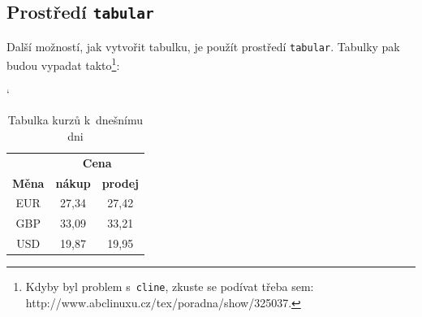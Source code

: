 \documentclass[a4paper,11pt]{article}
\begin{document}
\subsection{Prostředí \textup{\texttt{tabular}}}
Další možností, jak vytvořit tabulku, je použít prostředí \textup{\texttt{tabular}}. Tabulky pak budou vypadat takto\footnote{Kdyby byl problem s~\textup{\texttt{cline}}, zkuste se podívat třeba sem: http://www.abclinuxu.cz/tex/poradna/show/325037.}:
\begin{table}[ht]
\catcode`
\begin{center}
\begin{tabular}[t]{| c | c | c |} \hline
& \multicolumn{2}{|c|}{\textbf{Cena}} \\ \cline{2-3}
\textbf{Měna} & \textbf{nákup} & \textbf{prodej} \\ \hline
EUR & 27,34 & 27,42 \\
GBP & 33,09 & 33,21 \\
USD & 19,87 & 19,95 \\ \hline
\end{tabular}
\caption{Tabulka kurzů k~dnešnímu dni}
\label{tab1}
\end{center}
\end{table}
\end{document}
